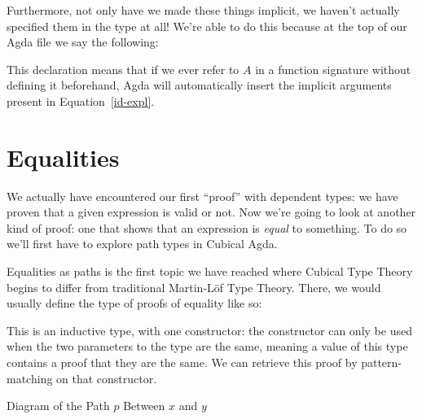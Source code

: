 Furthermore, not only have we made these things implicit, we haven't actually
specified them in the type at all!
We're able to do this because at the top of our Agda file we say the following:
\begin{agdalisting*}
\end{agdalisting*}
This  declaration means that if we ever refer to  \(A\) in
a function signature without defining it beforehand, Agda will automatically
insert the implicit arguments present in Equation~\ref{id-expl}.
\section{Equalities}
We actually have encountered our first ``proof'' with dependent types: we have
proven that a given expression is valid or not.
Now we're going to look at another kind of proof: one that shows that an
expression is \emph{equal} to something.
To do so we'll first have to explore path types in Cubical Agda.

Equalities as paths is the first topic we have reached where Cubical Type Theory
begins to differ from traditional Martin-Löf Type Theory.
There, we would usually define the type of proofs of equality like so:
\begin{agdalisting}
\end{agdalisting}
This is an inductive  type, with one constructor: the
constructor can only be used when the two parameters to the type are the same,
meaning a value of this type contains a proof that they are the same.
We can retrieve this proof by pattern-matching on that constructor.

\begin{marginfigure}
  \caption{Diagram of the Path \(p\) Between \(x\) and \(y\)}
  \label{path-diagram}
\end{marginfigure}

